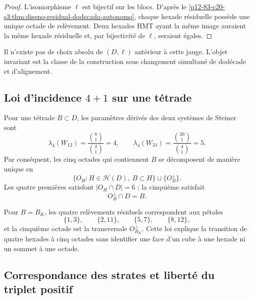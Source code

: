 \begin{proof}
L'isomorphisme \(\ell\) est bijectif sur les blocs. D'après le
\cref{p12-83-c20-s3:thm:diseno-residual-dodecada-autonomo}, chaque hexade résiduelle possède une
unique octade de relèvement. Deux hexades HMT ayant la même image auraient la même
hexade résiduelle et, par bijectivité de \(\ell\), seraient égales.
\end{proof}

Il n'existe pas de choix absolu de \((D,\ell)\) antérieur à cette jauge.
L'objet invariant est la classe de la construction sous changement simultané de
dodécade et d'alignement.

\subsection{Loi d'incidence \texorpdfstring{\(4+1\)}{4+1} sur une tétrade}

Pour une tétrade \(B\subset D\), les paramètres dérivés des deux
systèmes de Steiner sont
\begin{equation}
 \lambda_4(W_{12})
 =\frac{\binom81}{\binom21}=4,
 \qquad
 \lambda_4(W_{24})
 =\frac{\binom{20}1}{\binom41}=5.
 \label{p12-83-c20-s3:eq:ley-cuatro-mas-uno-witt}
\end{equation}
Par conséquent, les cinq octades qui contiennent \(B\) se décomposent de manière
unique en
\begin{equation}
 \{O_H:H\in\mathcal H(D),\ B\subset H\}
 \sqcup\{O_B^\perp\}.
 \label{p12-83-c20-s3:eq:descomposicion-cinco-octadas}
\end{equation}
Les quatre premières satisfont \(|O_H\cap D|=6\) ; la cinquième satisfait
\begin{equation}
 O_B^\perp\cap D=B.
 \label{p12-83-c20-s3:eq:octada-transversal-tetrada}
\end{equation}

Pour \(B=B_K\), les quatre relèvements résiduels correspondent aux
pétales
\[
 \{1,3\},
 \qquad
 \{2,11\},
 \qquad
 \{5,7\},
 \qquad
 \{8,12\},
\]
et la cinquième octade est la transversale \(O_{B_K}^\perp\). Cette loi explique
la transition de quatre hexades à cinq octades sans identifier une face
d'un cube à une hexade ni un sommet à une octade.

\subsection{Correspondance des strates et liberté du triplet positif}


